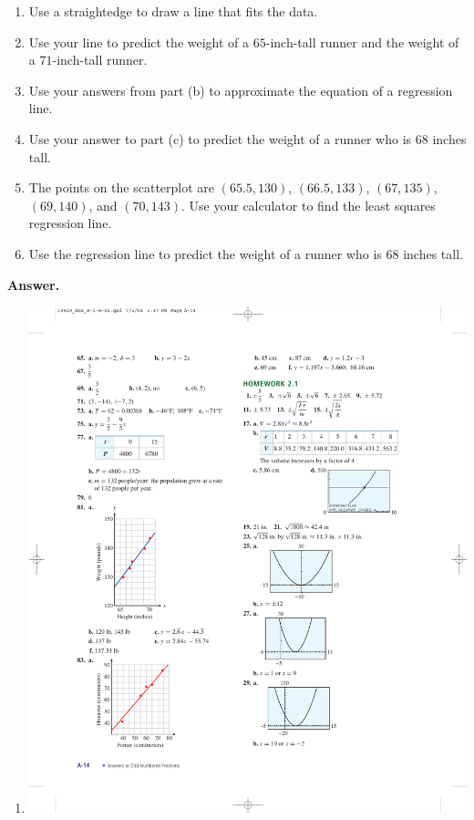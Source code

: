 \documentclass[10pt,]{book}
\theoremstyle{plain}
\theoremstyle{definition}
\theoremstyle{definition}
\theoremstyle{definition}
\theoremstyle{definition}
\numberwithin{equation}{part}
\begin{document}
\begin{exerciselist}
 \leavevmode%
\begin{enumerate}[label=*\alph**]
\item\hypertarget{li-1662}{}Use a straightedge to draw a line that fits the data.%
\item\hypertarget{li-1663}{}Use your line to predict the weight of a \(65\)-inch-tall runner and the weight of a \(71\)-inch-tall runner.%
\item\hypertarget{li-1664}{}Use your answers from part (b) to approximate the equation of a regression line.%
\item\hypertarget{li-1665}{}Use your answer to part (c) to predict the weight of a runner who is \(68\) inches tall.%
\item\hypertarget{li-1666}{}The points on the scatterplot are \((65.5, 130)\), \((66.5, 133)\), \((67, 135)\), \((69, 140)\), and \((70, 143)\). Use your calculator to find the least squares regression line.%
\item\hypertarget{li-1667}{}Use the regression line to predict the weight of a runner who is \(68\) inches tall.%
\end{enumerate}
%
\par\smallskip
\par\smallskip
\noindent\textbf{Answer.}\hypertarget{answer-263}{}\quad
\leavevmode%
\begin{multicols}{2}
\begin{enumerate}[label=*\alph**]
\item\hypertarget{li-1668}{}\includegraphics[width=0.7\linewidth]{images/fig-ans-chap1-rev-81}

\end{enumerate}
\end{multicols}
\end{exerciselist}
\end{document}
